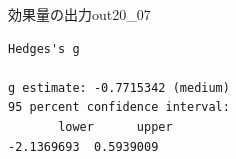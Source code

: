 \begin{Rscreen}{効果量の出力}{out20_07}
	\begin{verbatim}
Hedges's g

g estimate: -0.7715342 (medium)
95 percent confidence interval:
       lower      upper 
-2.1369693  0.5939009 
\end{verbatim}
\end{Rscreen}
